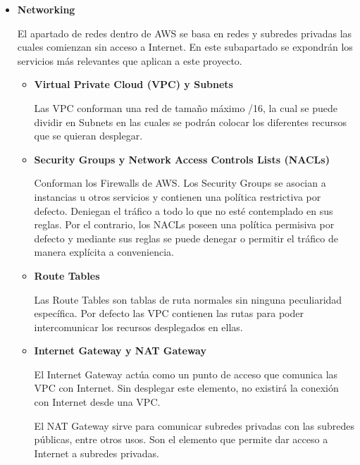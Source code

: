 \documentclass[../../memoria.tex]{subfiles}
\begin{document}
\begin{itemize}
    \item \textbf{Networking}
          \par
          El apartado de redes dentro de AWS se basa en redes y subredes privadas las cuales comienzan sin acceso a Internet. En este subapartado se expondrán los servicios más relevantes que aplican a este proyecto.
          \begin{itemize}
              \item \textbf{Virtual Private Cloud (VPC) y Subnets}
                    \par
                    Las VPC conforman una red de tamaño máximo /16, la cual se puede dividir en Subnets en las cuales se podrán colocar los diferentes recursos que se quieran desplegar.
              \item \textbf{Security Groups y Network Access Controls Lists (NACLs)}
                    \par
                    Conforman los Firewalls de AWS. Los Security Groups se asocian a instancias u otros servicios y contienen una política restrictiva por defecto. Deniegan el tráfico a todo lo que no esté contemplado en sus reglas. Por el contrario, los NACLs poseen una política permisiva por defecto y mediante sus reglas se puede denegar o permitir el tráfico de manera explícita a conveniencia.
              \item \textbf{Route Tables }
                    \par
                    Las Route Tables son tablas de ruta normales sin ninguna peculiaridad específica. Por defecto las VPC contienen las rutas para poder intercomunicar los recursos desplegados en ellas.
              \item \textbf{Internet Gateway y NAT Gateway }
                    \par
                    El Internet Gateway actúa como un punto de acceso que comunica las VPC con Internet. Sin desplegar este elemento, no existirá la conexión con Internet desde una VPC.

                    El NAT Gateway sirve para comunicar subredes privadas con las subredes públicas, entre otros usos. Son el elemento que permite dar acceso a Internet a subredes privadas.
          \end{itemize}


\end{itemize}
\end{document}
